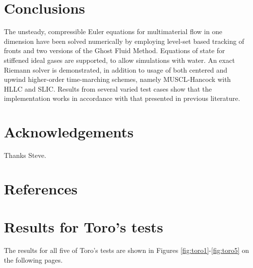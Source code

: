 \documentclass[final,3p,twocolumn]{elsarticle}
\begin{document}

\section{Conclusions}
\label{sec:conclusion}

The unsteady, compressible Euler equations for multimaterial flow in one
dimension have been solved numerically by employing level-set based
tracking of fronts and two versions of the Ghost Fluid Method. Equations of
state for stiffened ideal gases are supported, to allow simulations with
water. An exact Riemann solver is demonstrated, in addition to usage of
both centered and upwind higher-order time-marching schemes, namely
MUSCL-Hancock with HLLC and SLIC. Results from several varied test cases
show that the implementation works in accordance with that presented in
previous literature. 

\section*{Acknowledgements}
\label{sec:acknowledgements}
Thanks Steve. 

\section*{References}



\appendix
\section{Results for Toro's tests}
\label{app:toro}

The results for all five of Toro's tests are shown in Figures
\ref{fig:toro1}-\ref{fig:toro5} on the following pages. 

\end{document}
